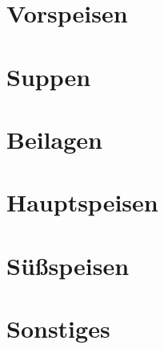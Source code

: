 \documentclass[twocolumn]{cookbook}
\begin{document}
\chapter{Vorspeisen}


\chapter{Suppen}


\chapter{Beilagen}


\chapter{Hauptspeisen}


\chapter{Süßspeisen}


\chapter{Sonstiges}


\printbibliography
\printindex[region]
\printindex[ingredient]
\printindex
\end{document}
